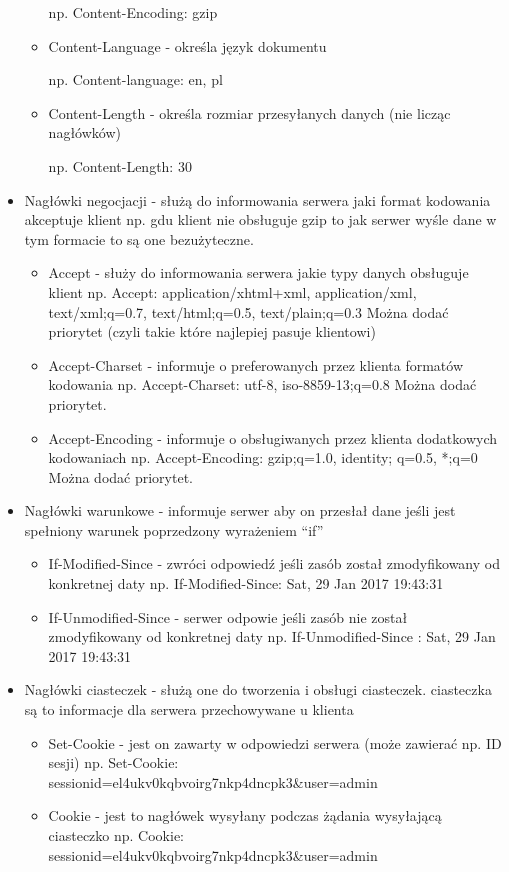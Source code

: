 \documentclass[a4paper,12pt,oneside]{book}
\begin{document}
\begin{itemize}
\begin{itemize}
							np. Content-Encoding: gzip
							\item Content-Language - określa język dokumentu 
							
							np. Content-language: en, pl
							\item Content-Length - określa rozmiar przesyłanych danych (nie licząc
							nagłówków) 
							
							np. Content-Length: 30
						\end{itemize}
					\item Nagłówki negocjacji - służą do informowania serwera jaki format kodowania
					akceptuje klient np. gdu klient nie obsługuje gzip to jak serwer wyśle dane w tym
					formacie to są one bezużyteczne.
					
					\begin{itemize}
						\item Accept - służy do informowania serwera jakie typy danych obsługuje klient
						np. Accept: application/xhtml+xml, application/xml, text/xml;q=0.7,
						text/html;q=0.5, text/plain;q=0.3
						Można dodać priorytet (czyli takie które najlepiej pasuje klientowi)
						\item Accept-Charset - informuje o preferowanych przez klienta formatów
						kodowania np. Accept-Charset: utf-8, iso-8859-13;q=0.8
						Można dodać priorytet.
						\item Accept-Encoding - informuje o obsługiwanych przez klienta dodatkowych
						kodowaniach np. Accept-Encoding: gzip;q=1.0, identity; q=0.5, *;q=0
						Można dodać priorytet.
					\end{itemize}
					\item Nagłówki warunkowe - informuje serwer aby on przesłał dane jeśli jest spełniony
					warunek poprzedzony wyrażeniem “if”
					\begin{itemize}
						\item If-Modified-Since - zwróci odpowiedź jeśli zasób został zmodyfikowany od
						konkretnej daty np. If-Modified-Since: Sat, 29 Jan 2017 19:43:31
						\item If-Unmodified-Since - serwer odpowie jeśli zasób nie został zmodyfikowany
						od konkretnej daty np. If-Unmodified-Since : Sat, 29 Jan 2017 19:43:31
					\end{itemize}
					\item Nagłówki ciasteczek - służą one do tworzenia i obsługi ciasteczek. ciasteczka są to
					informacje dla serwera przechowywane u klienta
					\begin{itemize}
						\item Set-Cookie - jest on zawarty w odpowiedzi serwera (może zawierać np. ID
						sesji) np. Set-Cookie: sessionid=el4ukv0kqbvoirg7nkp4dncpk3\&user=admin
						\item Cookie - jest to nagłówek wysyłany podczas żądania wysyłającą ciasteczko
						np. Cookie: sessionid=el4ukv0kqbvoirg7nkp4dncpk3\&user=admin
					\end{itemize}
				\end{itemize}
\end{document}
